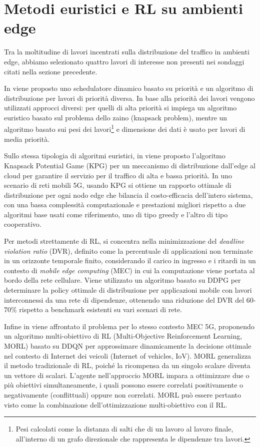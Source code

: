 \section{Metodi euristici e RL su ambienti edge}

Tra la moltitudine di lavori incentrati sulla distribuzione del traffico in ambienti edge, abbiamo selezionato quattro lavori di interesse non presenti nei sondaggi citati nella sezione precedente.

In \cite{Chai2021} viene proposto uno schedulatore dinamico basato su priorità e un algoritmo di distribuzione per lavori di priorità diversa. In base alla priorità dei lavori vengono utilizzati approcci diversi: per quelli di alta priorità si impiega un algoritmo euristico basato sul problema dello zaino (knapsack problem), mentre un algoritmo basato sui pesi dei lavori\footnote{Pesi calcolati come la distanza di salti che di un lavoro al lavoro finale, all'interno di un grafo direzionale che rappresenta le dipendenze tra lavori.} e dimensione dei dati è usato per lavori di media priorità.

Sullo stessa tipologia di algoritmi euristici, in \cite{Hsieh2023} viene proposto l'algoritmo Knapsack Potential Game (KPG) per un meccanismo di distribuzione dall'edge al cloud per garantire il servizio per il traffico di alta e bassa priorità. In uno scenario di reti mobili 5G, usando KPG si ottiene un rapporto ottimale di distribuzione per ogni nodo edge che bilancia il costo-efficacia dell'intero sistema, con una bassa complessità computazionale e prestazioni migliori rispetto a due algoritmi base usati come riferimento, uno di tipo greedy e l'altro di tipo cooperativo.

Per metodi strettamente di RL, \cite{Liu2023} si concentra nella minimizzazione del \textit{deadline violation ratio} (DVR), definito come la percentuale di applicazioni non terminate in un orizzonte temporale finito, considerando il carico in ingresso e i ritardi in un contesto di \textit{mobile edge computing} (MEC) in cui la computazione viene portata al bordo della rete cellulare. Viene utilizzato un algoritmo basato su DDPG per determinare la policy ottimale di distribuzione per applicazioni mobile con lavori interconnessi da una rete di dipendenze, ottenendo una riduzione del DVR del 60-70\% rispetto a benchmark esistenti su vari scenari di rete.

Infine in \cite{Zhang2023} viene affrontato il problema per lo stesso contesto MEC 5G, proponendo un algoritmo multi-obiettivo di RL (Multi-Objective Reinforcement Learning, MORL) basato su DDQN per approssimare dinamicamente la decisione ottimale nel contesto di Internet dei veicoli (Internet of vehicles, IoV). MORL generalizza il metodo tradizionale di RL, poiché la ricompensa da un singolo scalare diventa un vettore di scalari. L'agente nell'approccio MORL impara a ottimizzare due o più obiettivi simultaneamente, i quali possono essere correlati positivamente o negativamente (conflittuali) oppure non correlati. MORL può essere pertanto visto come la combinazione dell'ottimizzazione multi-obiettivo con il RL.

